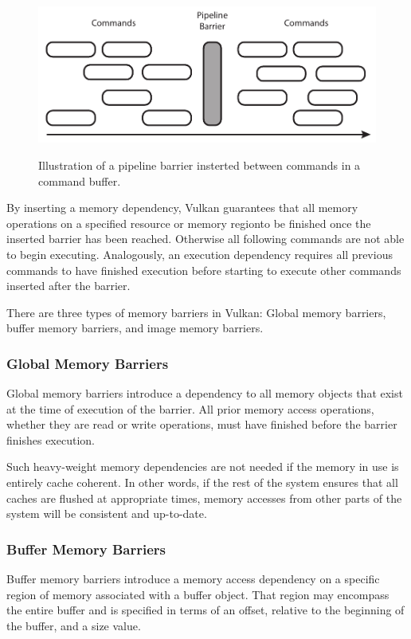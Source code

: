       \begin{figure}
        \caption{Illustration of a pipeline barrier insterted between commands in a command buffer.}
        \centering
        \includegraphics{Main/Images/PipelineBarrier}
        \label{fig:PipelineBarrier}
      \end{figure}

      By inserting a memory dependency, Vulkan guarantees that all memory operations on a specified resource or memory regionto be finished once the inserted barrier has been reached. Otherwise all following commands are not able to begin executing. Analogously, an execution dependency requires all previous commands to have finished execution before starting to execute other commands inserted after the barrier.

      There are three types of memory barriers in Vulkan: Global memory barriers, buffer memory barriers, and image memory barriers.

      \subsubsection{Global Memory Barriers}
        Global memory barriers introduce a dependency to all memory objects that exist at the time of execution of the barrier. All prior memory access operations, whether they are read or write operations, must have finished before the barrier finishes execution.

        Such heavy-weight memory dependencies are not needed if the memory in use is entirely cache coherent. In other words, if the rest of the system ensures that all caches are flushed at appropriate times, memory accesses from other parts of the system will be consistent and up-to-date.

      \subsubsection{Buffer Memory Barriers}
        Buffer memory barriers introduce a memory access dependency on a specific region of memory associated with a buffer object. That region may encompass the entire buffer and is specified in terms of an offset, relative to the beginning of the buffer, and a size value.

